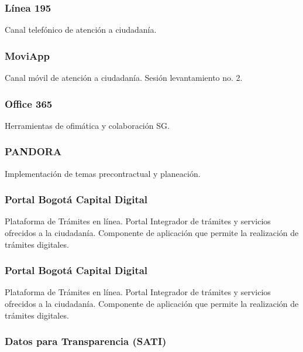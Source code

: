 \documentclass[
	a4paper, %
	12pt, %
]{include/CSSullivanBusinessReport}
\begin{document}
\subsubsection{Línea 195}\label{sec:luxednea-195}

Canal telefónico de atención a ciudadanía.

\subsubsection{MoviApp}\label{sec:moviapp}

Canal móvil de atención a ciudadanía. Sesión levantamiento no. 2.

\subsubsection{Office 365}\label{sec:office-365}

Herramientas de ofimática y colaboración SG.

\subsubsection{PANDORA}\label{sec:pandora}

Implementación de temas precontractual y planeación.

\subsubsection{Portal Bogotá Capital
Digital}\label{sec:portal-bogotuxe1-capital-digital}

Plataforma de Trámites en línea. Portal Integrador de trámites y
servicios ofrecidos a la ciudadanía. Componente de aplicación que
permite la realización de trámites digitales.

\subsubsection{Portal Bogotá Capital
Digital}\label{sec:portal-bogotuxe1-capital-digital-1}

Plataforma de Trámites en línea. Portal Integrador de trámites y
servicios ofrecidos a la ciudadanía. Componente de aplicación que
permite la realización de trámites digitales.

\subsubsection{Datos para Transparencia
(SATI)}\label{sec:datos-para-transparencia-sati-1}
\end{document}
